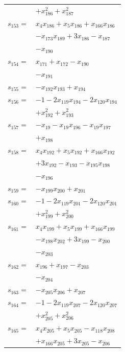 \begin{longtable}{@{}r@{\;}l@{}}
 & \(\displaystyle +x_{186}^{2} +x_{187}^{2}\) \\[3pt]
\(s_{153}=\) & \(\displaystyle x_{4}x_{186} +x_{5}x_{186} +x_{166}x_{186}\) \\
 & \(\displaystyle -x_{173}x_{189} +3x_{186} -x_{187}\) \\
 & \(\displaystyle -x_{190}\) \\[3pt]
\(s_{154}=\) & \(\displaystyle x_{171} +x_{172} -x_{190}\) \\
 & \(\displaystyle -x_{191}\) \\[3pt]
\(s_{155}=\) & \(\displaystyle -x_{192}x_{193} +x_{194}\) \\[3pt]
\(s_{156}=\) & \(\displaystyle -1 -2x_{119}x_{194} -2x_{120}x_{194}\) \\
 & \(\displaystyle +x_{192}^{2} +x_{193}^{2}\) \\[3pt]
\(s_{157}=\) & \(\displaystyle -x_{19} -x_{19}x_{196} -x_{19}x_{197}\) \\
 & \(\displaystyle +x_{198}\) \\[3pt]
\(s_{158}=\) & \(\displaystyle x_{4}x_{192} +x_{5}x_{192} +x_{166}x_{192}\) \\
 & \(\displaystyle +3x_{192} -x_{193} -x_{195}x_{198}\) \\
 & \(\displaystyle -x_{196}\) \\[3pt]
\(s_{159}=\) & \(\displaystyle -x_{199}x_{200} +x_{201}\) \\[3pt]
\(s_{160}=\) & \(\displaystyle -1 -2x_{119}x_{201} -2x_{120}x_{201}\) \\
 & \(\displaystyle +x_{199}^{2} +x_{200}^{2}\) \\[3pt]
\(s_{161}=\) & \(\displaystyle x_{4}x_{199} +x_{5}x_{199} +x_{166}x_{199}\) \\
 & \(\displaystyle -x_{198}x_{202} +3x_{199} -x_{200}\) \\
 & \(\displaystyle -x_{203}\) \\[3pt]
\(s_{162}=\) & \(\displaystyle x_{196} +x_{197} -x_{203}\) \\
 & \(\displaystyle -x_{204}\) \\[3pt]
\(s_{163}=\) & \(\displaystyle -x_{205}x_{206} +x_{207}\) \\[3pt]
\(s_{164}=\) & \(\displaystyle -1 -2x_{119}x_{207} -2x_{120}x_{207}\) \\
 & \(\displaystyle +x_{205}^{2} +x_{206}^{2}\) \\[3pt]
\(s_{165}=\) & \(\displaystyle x_{4}x_{205} +x_{5}x_{205} -x_{118}x_{208}\) \\
 & \(\displaystyle +x_{166}x_{205} +3x_{205} -x_{206}\) \\

\end{longtable}
